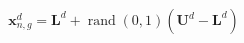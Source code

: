 \begin{equation}
\textbf{x}_{n,g}^{d}=\textbf{L}^{d}+\operatorname{rand}(0,1)\left(\textbf{U}^{d}-\textbf{L}^{d}\right)
\label{initlize}
\end{equation}